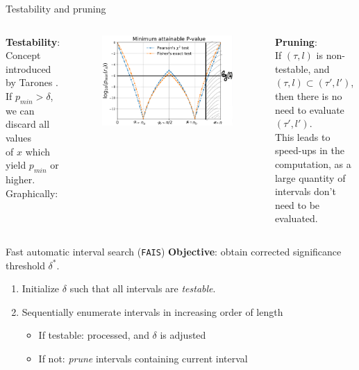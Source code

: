 \documentclass[aspectratio=32, 10pt]{beamer}
\begin{document}
\begin{frame}[fragile]{Testability and pruning}

\begin{columns}[T,onlytextwidth]
\textbf{Testability}:\\
Concept introduced by Tarones \cite{tarone1990modified}. \\
If $p_{min}>\delta$, we can discard all values\\ of $x$ which yield $p_{min}$ or higher.\\
Graphically:
\begin{figure}
    \centering
    \includegraphics[width=.8\textwidth]{figures/min_p_value_tarone.png}
\end{figure}

\textbf{Pruning}:\\
If $(\tau, l)$ is non-testable, and $(\tau, l)\subset(\tau', l')$, then there is no need to evaluate $(\tau', l')$.\\
\vspace{12pt}
This leads to speed-ups in the computation, as a large quantity of intervals don't need to be evaluated.
\end{columns}
\end{frame}

\begin{frame}[fragile]{Fast automatic interval search (\texttt{FAIS})}
\textbf{Objective}: obtain corrected significance threshold $\delta^*$.\\
\begin{enumerate}
    \item Initialize $\delta$ such that all intervals are \emph{testable}.
    \item Sequentially enumerate intervals in increasing order of length
    \begin{itemize}
        \item If testable: processed, and $\delta$ is adjusted
        \item If not: \emph{prune} intervals containing current interval
    \end{itemize}
\end{enumerate}
\end{frame}
\end{document}
